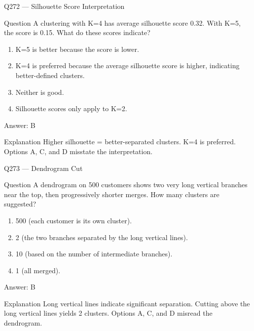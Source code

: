 \documentclass[aspectratio=169,8pt]{beamer}
\begin{document}
\begin{frame}{Q272 --- Silhouette Score Interpretation}
\begin{block}{Question}
A clustering with K=4 has average silhouette score 0.32. With K=5, the score is 0.15. What do these scores indicate?
\begin{enumerate}
\item K=5 is better because the score is lower.
\item K=4 is preferred because the average silhouette score is higher, indicating better-defined clusters.
\item Neither is good.
\item Silhouette scores only apply to K=2.
\end{enumerate}  \end{block}
\begin{exampleblock}{Answer: B}\end{exampleblock}
\begin{block}{Explanation}
Higher silhouette = better-separated clusters. K=4 is preferred. Options A, C, and D misstate the interpretation.
\end{block}
\end{frame}

\begin{frame}{Q273 --- Dendrogram Cut}
\begin{block}{Question}
A dendrogram on 500 customers shows two very long vertical branches near the top, then progressively shorter merges. How many clusters are suggested?
\end{block}
\begin{enumerate}
\item 500 (each customer is its own cluster).
\item 2 (the two branches separated by the long vertical lines).
\item 10 (based on the number of intermediate branches).
\item 1 (all merged).
\end{enumerate}
\begin{exampleblock}{Answer: B}\end{exampleblock}
\begin{block}{Explanation}
Long vertical lines indicate significant separation. Cutting above the long vertical lines yields 2 clusters. Options A, C, and D misread the dendrogram.
\end{block}
\end{frame}
\end{document}
